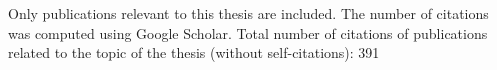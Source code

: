 \vfill

\noindent Only publications relevant to this thesis are included. The number of
citations was computed using Google Scholar. Total number of citations of
publications related to the topic of the thesis (without self-citations):
{\large 391} %



